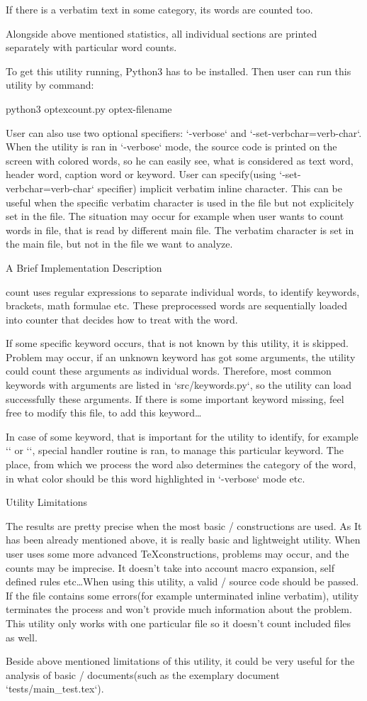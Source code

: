 If there is a verbatim text in some category, its words are counted too.

Alongside above mentioned statistics, all individual sections are printed separately with particular word counts.

To get this utility running, Python3 has to be installed. Then user can run this utility by command:

\begtt
python3 optexcount.py optex-filename
\endtt

User can also use two optional specifiers: {\Blue `-verbose`} and {\Blue `-set-verbchar=verb-char`}. When the utility is ran in {\Blue `-verbose`} mode, the source code is printed on the screen with colored words, so he can easily see, what is considered as text word, header word, caption word or keyword. User can specify(using {\Blue `-set-verbchar=verb-char`} specifier) implicit verbatim inline character. This can be useful when the specific verbatim character is used in the file but not explicitely set in the file. The situation may occur for example when user wants to count words in file, that is read by different main file. The verbatim character is set in the main file, but not in the file we want to analyze.

\sec A Brief Implementation Description

\OpTeX count uses regular expressions to separate individual words, to identify keywords, brackets, math formulae etc. These preprocessed words are sequentially loaded into counter that decides how to treat with the word.

If some specific keyword occurs, that is not known by this utility, it is skipped. Problem may occur, if an unknown keyword has got some arguments, the utility could count these arguments as individual words. Therefore, most common keywords with arguments are listed in `src/keywords.py`, so the utility can load successfully these arguments. If there is some important keyword missing, feel free to modify this file, to add this keyword\dots

In case of some keyword, that is important for the utility to identify, for example {\Blue `\sec`} or {\Blue `\fnote`}, special handler routine is ran, to manage this particular keyword. The place, from which we process the word also determines the category of the word, in what color should be this word highlighted in {\Blue `-verbose`} mode etc.


\sec Utility Limitations

The results are pretty precise when the most basic \OpTeX/ constructions are used. As It has been already mentioned above, it is really basic and lightweight utility. When user uses some more advanced \TeX constructions, problems may occur, and the counts may be imprecise. It doesn't take into account macro expansion, self defined rules etc\dots When using this utility, a valid \OpTeX/ source code should be passed. If the file contains some errors(for example unterminated inline verbatim), utility terminates the process and won't provide much information about the problem. This utility only works with one particular file so it doesn't count included files as well.

Beside above mentioned limitations of this utility, it could be very useful for the analysis of basic \OpTeX/ documents(such as the exemplary document {\Blue `tests/main_test.tex`}).

\bye
